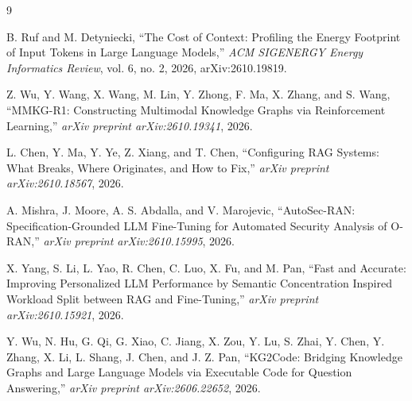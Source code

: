 \documentclass[10pt,journal,compsoc]{IEEEtran}
\begin{document}
\begin{thebibliography}{9}

B. Ruf and M. Detyniecki, ``The Cost of Context: Profiling the Energy Footprint of Input Tokens in Large Language Models,'' \emph{ACM SIGENERGY Energy Informatics Review}, vol. 6, no. 2, 2026, arXiv:2610.19819.

Z. Wu, Y. Wang, X. Wang, M. Lin, Y. Zhong, F. Ma, X. Zhang, and S. Wang, ``MMKG-R1: Constructing Multimodal Knowledge Graphs via Reinforcement Learning,'' \emph{arXiv preprint arXiv:2610.19341}, 2026.

L. Chen, Y. Ma, Y. Ye, Z. Xiang, and T. Chen, ``Configuring RAG Systems: What Breaks, Where Originates, and How to Fix,'' \emph{arXiv preprint arXiv:2610.18567}, 2026.

A. Mishra, J. Moore, A. S. Abdalla, and V. Marojevic, ``AutoSec-RAN: Specification-Grounded LLM Fine-Tuning for Automated Security Analysis of O-RAN,'' \emph{arXiv preprint arXiv:2610.15995}, 2026.

X. Yang, S. Li, L. Yao, R. Chen, C. Luo, X. Fu, and M. Pan, ``Fast and Accurate: Improving Personalized LLM Performance by Semantic Concentration Inspired Workload Split between RAG and Fine-Tuning,'' \emph{arXiv preprint arXiv:2610.15921}, 2026.

Y. Wu, N. Hu, G. Qi, G. Xiao, C. Jiang, X. Zou, Y. Lu, S. Zhai, Y. Chen, Y. Zhang, X. Li, L. Shang, J. Chen, and J. Z. Pan, ``KG2Code: Bridging Knowledge Graphs and Large Language Models via Executable Code for Question Answering,'' \emph{arXiv preprint arXiv:2606.22652}, 2026.

\end{thebibliography}
\end{document}
